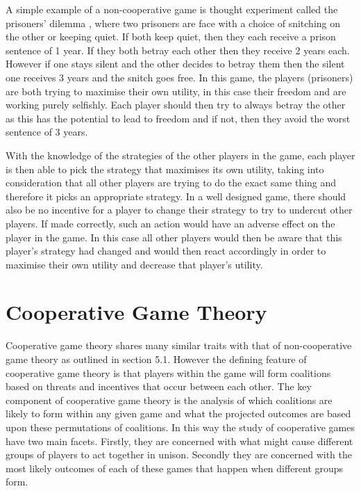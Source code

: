 \documentclass[a4paper, notitlepage]{report}
\begin{document}
A simple example of a non-cooperative game is thought experiment called the
prisoners' dilemma \cite{poundstone1993prisoner}, where two prisoners are face
with a choice of snitching on the other or keeping quiet. If both keep quiet,
then they each receive a prison sentence of 1 year. If they both betray each other
then they receive 2 years each. However if one stays silent and the other
decides to betray them then the silent one receives 3 years and the snitch goes
free. In this game, the players (prisoners) are both trying to maximise their
own utility, in this case their freedom and are working purely selfishly. Each
player should then try to always betray the other as this has the potential to
lead to freedom and if not, then they avoid the worst sentence of 3 years. 

With the knowledge of the strategies of the other players in the game, each
player is then able to pick the strategy that maximises its own utility, taking
into consideration that all other players are trying to do the exact same thing
and therefore it picks an appropriate strategy. In a well designed game, there
should also be no incentive for a player to change their strategy to try to
undercut other players. If made correctly, such an action would have an adverse
effect on the player in the game. In this case all other players would then be
aware that this player’s strategy had changed and would then react accordingly
in order to maximise their own utility and decrease that player’s utility.
\section{Cooperative Game Theory}
\label{sec:org7a514ae}
Cooperative game theory shares many similar traits with that of non-cooperative
game theory as outlined in section 5.1. However the defining feature of
cooperative game theory is that players within the game will form coalitions
based on threats and incentives that occur between each other. The key component
of cooperative game theory is the analysis of which coalitions are likely to
form within any given game and what the projected outcomes are based upon these
permutations of coalitions. In this way the study of cooperative games have two
main facets. Firstly, they are concerned with what might cause different groups
of players to act together in unison. Secondly they are concerned with the most
likely outcomes of each of these games that happen when different groups form.
\end{document}
